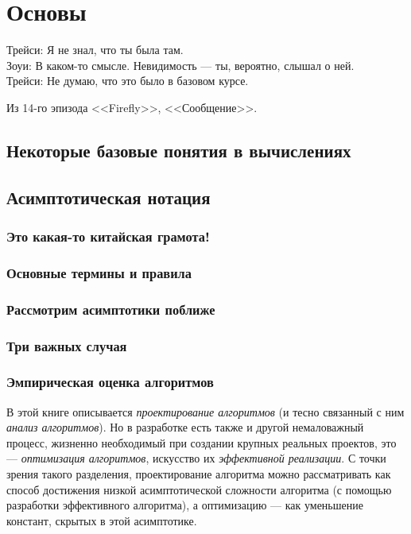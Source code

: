 \chapter{Основы}
\label{chap:basics}

\epigraph{Трейси: Я не знал, что ты была там.\\
Зоуи: В каком-то смысле. Невидимость — ты, вероятно, слышал о ней.\\
Трейси: Не думаю, что это было в базовом курсе.
}{Из 14-го эпизода <<Firefly>>, <<Сообщение>>.}



\section{Некоторые базовые понятия в вычислениях}

\section{Асимптотическая нотация}
\subsection{Это какая-то китайская грамота!}
\subsection{Основные термины и правила}
\subsection{Рассмотрим асимптотики поближе}
\subsection{Три важных случая}
\subsection{Эмпирическая оценка алгоритмов}
\label{sec:empirical-evaluation}

В этой книге описывается\textit{ проектирование алгоритмов} (и тесно связанный с ним\textit{ анализ алгоритмов}). Но в разработке есть также и другой немаловажный процесс, жизненно необходимый при создании крупных реальных проектов, это — \textit{оптимизация алгоритмов}, искусство их \textit{эффективной реализации}. С точки зрения такого разделения, проектирование алгоритма можно рассматривать как способ достижения низкой асимптотической сложности алгоритма (с помощью разработки эффективного алгоритма), а оптимизацию — как уменьшение констант, скрытых в этой асимптотике.

